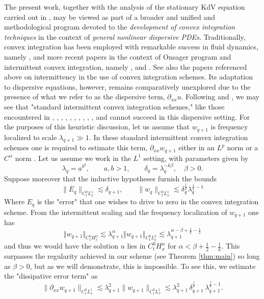 \documentclass[12pt,reqno,letterpaper]{amsart}
\numberwithin{equation}{section}
\newcommand{\1}{{\bf 1}}
\newcommand{\2}{{\bf 2}}
\theoremstyle{remark}
\theoremstyle{remark}
\begin{document}
The present work, together with the analysis of the stationary \textsf{KdV} equation carried out in \cite{Pathak}, may be viewed as part of a broader and \textsf{unified and methodological program} devoted to the \textit{development of convex integration techniques} in the context of \textit{general nonlinear dispersive PDEs}. Traditionally, convex integration has been employed with remarkable success in fluid dynamics, namely \cite{DLS09}, \cite{DLS13} and more recent papers in the context of Onsager program and intermittent convex integration, namely \cite{GKN23}, \cite{isett} and \cite{NV}. See also the papers referenced above on intermittency in the use of convex integration schemes. Its adaptation to dispersive equations, however, remains comparatively unexplored due to the presence of what we refer to as the dispersive term, $\partial_{xx}u$. Following \cite{Pathak} and \cite{Peng}, we may see that "standard intermittent convex integration schemes," like those encountered in \cite{BBV}, \cite{BCV}, \cite{BMNV}, \cite{BV19}, \cite{CL2}, \cite{CheskidovLuo}, \cite{DS17}, \cite{Luo}, \cite{MS}, \cite{NV}, and \cite{Peng} cannot succeed in this dispersive setting. For the purposes of this heuristic discussion, let us assume that $w_{q+1}$ is frequency localized to scale $\lambda_{q+1} \gg 1$. In these standard intermittent convex integration schemes one is required to estimate this term, $\partial_{xx}w_{q+1}$ either in an $L^p$ norm or a $C^\alpha$ norm \cite{BV2020}. 
Let us assume we work in the $L^1$ setting, with parameters given by
\[
\lambda_q = a^{b^{q}}, \qquad a,b>1, \qquad \delta_q = \lambda_q^{-k\beta}, \quad \beta>0.
\]
Suppose moreover that the inductive hypotheses furnish the bounds
\[
\|E_q\|_{C_t^0L^1_x} \lesssim \delta_{q+1}, \qquad \|w_q\|_{C^0_tL^1_x} \lesssim \delta_{q}^{\frac{1}{k}}\lambda_q^{\frac{1}{k}-1}
\]
Where $E_q$ is the "error" that one wishes to drive to zero in the convex integration scheme. From the intermittent scaling and the frequency localization of $w_{q+1}$ one has
$$
\Vert w_{q+1} \Vert_{C_t^0 H_x^\alpha} \lesssim \lambda_{q+1}^\alpha \Vert w_{q+1} \Vert_{C_t^0 L^2_x} \lesssim \lambda_{q+1}^{\alpha - \beta + \frac{1}{k} - \frac{1}{2}}
$$
and thus we would have the solution $u$ lies in $C_t^0 H^\alpha_x$ for $\alpha < \beta + \frac{1}{2} - \frac{1}{k}$. This surpasses the regularity achieved in our scheme (see Theorem \ref{thm:main}) so long as $\beta > 0$, but as we will demonstrate, this is impossible. To see this, we estimate the "dissipative error term" as
\begin{equation*}
\|\partial_{xx} w_{q+1}\|_{C_t^0L^1_x}
\lesssim \lambda_{q+1}^2 \|w_{q+1}\|_{C_t^0L^1_x} \lesssim \lambda_{q+1}^2 \, \delta_{q+1}^{\frac{1}{k}} \, \lambda_{q+1}^{\frac{1}{k}-1}.
\end{equation*}
\end{document}
